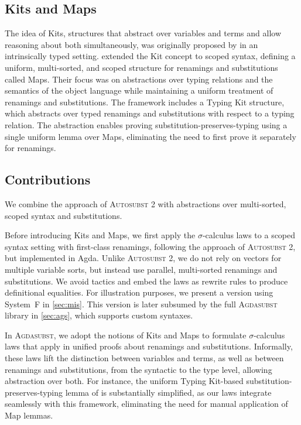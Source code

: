 \documentclass[screen,nonacm]{acmart}
\begin{document}
\subsection{Kits and Maps}
The idea of Kits, structures that abstract over variables and terms and allow
reasoning about both simultaneously, was originally proposed by \citet{ren-sub}
in an intrinsically typed setting. \citet{saffrich:LIPIcs.ITP.2024.32} extended
the Kit concept to scoped syntax, defining a uniform, multi-sorted, and scoped
structure for renamings and substitutions called Maps. Their focus was on
abstractions over typing relations and the semantics of the object language
while maintaining a uniform treatment of renamings and substitutions. The
framework includes a Typing Kit structure, which abstracts over typed renamings
and substitutions with respect to a typing relation. The abstraction enables
proving substitution-preserves-typing using a single uniform lemma over Maps,
eliminating the need to first prove it separately for renamings.

\subsection{Contributions}
We combine the approach of \textsc{Autosubst 2} with abstractions over
multi-sorted, scoped syntax and substitutions.

Before introducing Kits and Maps, we first apply the $σ$-calculus laws to a
scoped syntax setting with first-class renamings, following the approach of
\textsc{Autosubst 2}, but implemented in Agda. Unlike \textsc{Autosubst 2}, we
do not rely on vectors for multiple variable sorts, but instead use parallel,
multi-sorted renamings and substitutions. We avoid tactics and embed the laws
as rewrite rules to produce definitional equalities. For illustration purposes,
we present a version using System~F in \cref{sec:mis}. This version is later
subsumed by the full \textsc{Agdasubst} library in \cref{sec:ags}, which
supports custom syntaxes.

In \textsc{Agdasubst}, we adopt the notions of Kits and Maps to formulate
$σ$-calculus laws that apply in unified proofs about renamings and
substitutions. Informally, these laws lift the distinction between variables
and terms, as well as between renamings and substitutions, from the syntactic
to the type level, allowing abstraction over both. For instance, the uniform
Typing Kit-based substitution-preserves-typing lemma of
\citet{saffrich:LIPIcs.ITP.2024.32} is substantially simplified, as our laws
integrate seamlessly with this framework, eliminating the need for manual
application of Map lemmas.
\end{document}
